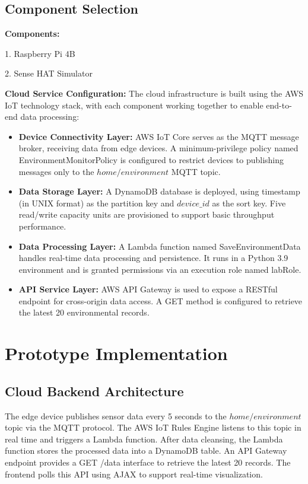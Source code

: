 \documentclass[12pt,a4paper]{article}
\begin{document}
\subsection{Component Selection}
\textbf{Components:}

1. Raspberry Pi 4B

2. Sense HAT Simulator 

\vspace{\baselineskip}
\noindent
\textbf{Cloud Service Configuration:}
The cloud infrastructure is built using the AWS IoT technology stack, with each component working together to enable end-to-end data processing:

\begin{itemize}
    \item \textbf{Device Connectivity Layer:} AWS IoT Core serves as the MQTT message broker, receiving data from edge devices. A minimum-privilege policy named EnvironmentMonitorPolicy is configured to restrict devices to publishing messages only to the $home/environment$ MQTT topic.
    \item \textbf{Data Storage Layer:} A DynamoDB database is deployed, using timestamp (in UNIX format) as the partition key and $device\_id$ as the sort key. Five read/write capacity units are provisioned to support basic throughput performance.
    \item \textbf{Data Processing Layer:} A Lambda function named SaveEnvironmentData handles real-time data processing and persistence. It runs in a Python 3.9 environment and is granted permissions via an execution role named labRole.
    \item \textbf{API Service Layer:} AWS API Gateway is used to expose a RESTful endpoint for cross-origin data access. A GET method is configured to retrieve the latest 20 environmental records.
\end{itemize}


\section{Prototype Implementation}

\subsection{Cloud Backend Architecture}
The edge device publishes sensor data every 5 seconds to the $home/environment$ topic via the MQTT protocol. The AWS IoT Rules Engine listens to this topic in real time and triggers a Lambda function. After data cleansing, the Lambda function stores the processed data into a DynamoDB table. An API Gateway endpoint provides a GET /data interface to retrieve the latest 20 records. The frontend polls this API using AJAX to support real-time visualization.
\end{document}
